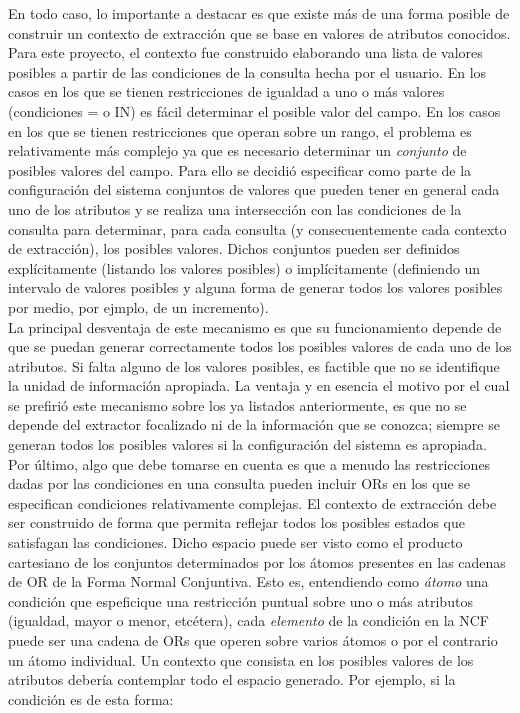 En todo caso, lo importante a destacar es que existe más de una forma posible de construir un contexto de extracción que se base en valores de atributos conocidos. Para este proyecto, el contexto fue construido elaborando una lista de valores posibles a partir de las condiciones de la consulta hecha por el usuario. En los casos en los que se tienen restricciones de igualdad a uno o más valores (condiciones = o IN) es fácil determinar el posible valor del campo. En los casos en los que se tienen restricciones que operan sobre un rango, el problema es relativamente más complejo ya que es necesario determinar un \emph{conjunto} de posibles valores del campo. Para ello se decidió especificar como parte de la configuración del sistema conjuntos de valores que pueden tener en general cada uno de los atributos y se realiza una intersección con las condiciones de la consulta para determinar, para cada consulta (y consecuentemente cada contexto de extracción), los posibles valores. Dichos conjuntos pueden ser definidos explícitamente (listando los valores posibles) o implícitamente (definiendo un intervalo de valores posibles y alguna forma de generar todos los valores posibles por medio, por ejmplo, de un incremento). \\

La principal desventaja de este mecanismo es que su funcionamiento depende de que se puedan generar correctamente todos los posibles valores de cada uno de los atributos. Si falta alguno de los valores posibles, es factible que no se identifique la unidad de información apropiada. La ventaja y en esencia el motivo por el cual se prefirió este mecanismo sobre los ya listados anteriormente, es que no se depende del extractor focalizado ni de la información que se conozca; siempre se generan todos los posibles valores si la configuración del sistema es apropiada. \\

Por último, algo que debe tomarse en cuenta es que a menudo las restricciones dadas por las condiciones en una consulta pueden incluir ORs en los que se especifican condiciones relativamente complejas. El contexto de extracción debe ser construido de forma que permita reflejar todos los posibles estados que satisfagan las condiciones. Dicho espacio puede ser visto como el producto cartesiano de los conjuntos determinados por los átomos presentes en las cadenas de OR de la Forma Normal Conjuntiva. Esto es, entendiendo como \emph{átomo} una condición que espeficique una restricción puntual sobre uno o más atributos (igualdad, mayor o menor, etcétera), cada \emph{elemento} de la condición en la NCF puede ser una cadena de ORs que operen sobre varios átomos o por el contrario un átomo individual. Un contexto que consista en los posibles valores de los atributos debería contemplar todo el espacio generado. Por ejemplo, si la condición es de esta forma: \\

